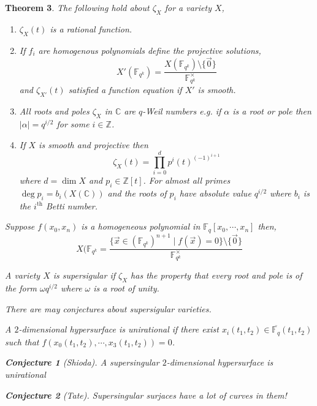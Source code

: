 \documentclass{article}
\newcommand{\Z}{\mathbb{Z}}
\newcommand{\C}{\mathbb{C}}
\newcommand{\finfield}[1]{\mathbb{F}_{#1}}
\newcommand{\sm}{\! \setminus \!}
\newenvironment{definition}[1][Definition:]{\begin{trivlist}
\item[\hskip \labelsep {\bfseries #1}]}{\end{trivlist}}
\theoremstyle{theorem}
\newtheorem{theorem}{Theorem}[section]
\newtheorem{conjecture}[theorem]{Conjecture}
\theoremstyle{definition}
\theoremstyle{definition}
\theoremstyle{remark}
\theoremstyle{definition}
\theoremstyle{remark}
\begin{document}
\begin{theorem}
The following hold about $\zeta_X$ for a variety $X$, 
\begin{enumerate}
\item $ \zeta_X(t)$ is a rational function.
\item If $f_i$ are homogenous polynomials define the projective solutions, 
\[ X'(\finfield{q^k}) = \frac{X(\finfield{q^k}) \sm \{ \vec{0} \}}{ \finfield{q^k}^\times} \]
and $\zeta_{X'}(t)$ satisfied a function equation if $X'$ is smooth. 
\item All roots and poles $\zeta_X$ in $\C$ are $q$-Weil numbers e.g. if $\alpha$ is a root or pole then $|\alpha| = q^{i/2}$ for some $i \in \Z$. 
\item If $X$ is smooth and projective then 
\[ \zeta_X(t) = \prod_{i = 0}^d p^i(t)^{(-1)^{i+1}} \]
where $d = \dim{X}$ and $p_i \in \Z[t]$. For almost all primes $\deg{p_i} = b_i(X(\C))$ and the roots of $p_i$ have absolute value $q^{i/2}$ where $b_i$ is the $i^{\mathrm{th}}$ Betti number.
\end{enumerate}

\begin{definition}
Suppose $f(x_0, x_n)$ is a homogeneous polynomial in $\finfield{q}[x_0, \cdots, x_n]$ then,
\[ X(\finfield{q^k} = \frac{ \{\vec{x} \in (\finfield{q^k})^{n+1} \mid f(\vec{x}) = 0\} \sm \{\vec{0}\}}{\finfield{q^k}^\times} \]
\end{definition}

\begin{definition}
A variety $X$ is supersigular if $\zeta_X$ has the property that every root and pole is of the form $\omega q^{i/2}$ where $\omega$ is a root of unity.
\end{definition}


There are may conjectures about supersigular varieties.

\begin{definition}
A $2$-dimensional hypersurface is unirational if there exist $x_i(t_1, t_2) \in \overline{\finfield{q}}(t_1, t_2)$ such that $f(x_0(t_1, t_2), \cdots, x_3(t_1, t_2)) = 0$. 
\end{definition}

\begin{conjecture}[Shioda]
A supersingular $2$-dimensional hypersurface is unirational 
\end{conjecture}

\begin{conjecture}[Tate]
Supersingular surjaces have a lot of curves in them!
\end{conjecture}

\end{theorem} 
\end{document}
